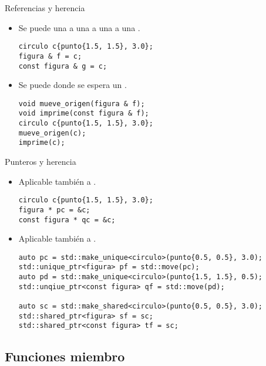 \begin{frame}[t,fragile]{Referencias y herencia}
\begin{itemize}

  \item Se puede  
        una  a una 
        a una  a una .
\begin{lstlisting}
circulo c{punto{1.5, 1.5}, 3.0};
figura & f = c;
const figura & g = c;
\end{lstlisting}

  \item Se puede  
         donde se espera un .
\begin{lstlisting}
void mueve_origen(figura & f);
void imprime(const figura & f);
circulo c{punto{1.5, 1.5}, 3.0};
mueve_origen(c);
imprime(c);
\end{lstlisting}

\end{itemize}
\end{frame}

\begin{frame}[t,fragile]{Punteros y herencia}
\begin{itemize}

  \item Aplicable también a .
\begin{lstlisting}
circulo c{punto{1.5, 1.5}, 3.0};
figura * pc = &c;
const figura * qc = &c;
\end{lstlisting}

  \item Aplicable también a .
\begin{lstlisting}
auto pc = std::make_unique<circulo>(punto{0.5, 0.5}, 3.0);
std::unique_ptr<figura> pf = std::move(pc);
auto pd = std::make_unique<circulo>(punto{1.5, 1.5}, 0.5);
std::unqiue_ptr<const figura> qf = std::move(pd);

auto sc = std::make_shared<circulo>(punto{0.5, 0.5}, 3.0);
std::shared_ptr<figura> sf = sc;
std::shared_ptr<const figura> tf = sc;
\end{lstlisting}

\end{itemize}
\end{frame}

\subsection{Funciones miembro}

